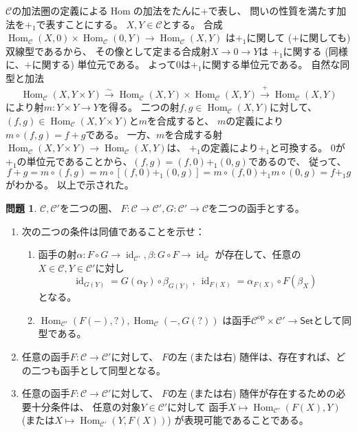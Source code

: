 \documentclass[uplatex,dvipdfmx]{jsarticle}
\makeatletter
\theoremstyle{definition}
\newtheorem{prob}[prob]{問題}
\renewenvironment{proof}[1][\proofname]{
  \pushQED{\qed}%
  \normalfont \topsep6\p@\@plus6\p@\relax
  \trivlist
  \item[\hskip\labelsep
    #1\@addpunct{\textbf{.}}]\ignorespaces
}{%
  \popQED\endtrivlist\@endpefalse
}
\providecommand{\proofname}{証明}
\DeclareMathOperator{\Hom}{\mathrm{Hom}}
\DeclareMathOperator{\id}{\mathrm{id}}
\newcommand{\op}{\mathrm{op}}
\newcommand\sfSet{\mathsf{Set}}
\newcommand\mcC{\mathcal{C}}
\makeatother
\begin{document}
\begin{proof}
  \(\mcC\)の加法圏の定義による\(\Hom\)の加法をたんに\(+\)で表し、
  問いの性質を満たす加法を\(+_1\)で表すことにする。
  \(X,Y\in \mcC\)とする。
  合成\(\Hom_{\mcC}(X,0)\times \Hom_{\mcC}(0,Y)\to \Hom_{\mcC}(X,Y)\)
  は\(+_1\)に関して (\(+\)に関しても) 双線型であるから、
  その像として定まる合成射\(X\to 0 \to Y\)は
  \(+_1\)に関する (同様に、\(+\)に関する) 単位元である。
  よって\(0\)は\(+_1\)に関する単位元である。
  自然な同型と加法
  \[
  \Hom_{\mcC}(X,Y\times Y) \xrightarrow{\sim}
  \Hom_{\mcC}(X,Y) \times \Hom_{\mcC}(X,Y) \xrightarrow{+} \Hom_{\mcC}(X,Y)
  \]
  により射\(m:Y\times Y\to Y\)を得る。
  二つの射\(f,g\in \Hom_{\mcC}(X,Y)\)に対して、
  \((f,g)\in \Hom_{\mcC}(X,Y\times Y)\)と\(m\)を合成すると、
  \(m\)の定義により\(m\circ (f,g) = f+g\)である。
  一方、\(m\)を合成する射
  \(\Hom_{\mcC}(X,Y\times Y) \to \Hom_{\mcC}(X,Y)\)は、
  \(+_1\)の定義により\(+_1\)と可換する。
  \(0\)が\(+_1\)の単位元であることから、\((f,g) = (f,0) +_1 (0,g)\)であるので、
  従って、
  \[
  f+g = m\circ (f,g) = m\circ [(f,0)+_1(0,g)]
  = m\circ (f,0) +_1 m\circ (0,g)
  = f+_1 g
  \]
  がわかる。
  以上で示された。
\end{proof}



\begin{prob}\label{prob: 1.2}
  \(\mcC,\mcC'\)を二つの圏、
  \(F:\mcC\to \mcC', G:\mcC'\to \mcC\)を二つの函手とする。
  \begin{enumerate}
    \item \label{enumi: 1.2.1}
    次の二つの条件は同値であることを示せ：
    \begin{enumerate}
      \item \label{enumii: 1.2.1.1}
      函手の射\(\alpha:F\circ G \to \id_{\mcC'}, \beta:G\circ F \to \id_{\mcC}\)
      が存在して、任意の\(X\in \mcC, Y\in \mcC'\)に対し
      \[
      \id_{G(Y)} = G(\alpha_Y) \circ \beta_{G(Y)} \ , \
      \id_{F(X)} = \alpha_{F(X)} \circ F(\beta_X)
      \]
      となる。
      \item \label{enumii: 1.2.1.2}
      \(\Hom_{\mcC'}(F(-),?),\Hom_{\mcC}(-,G(?))\)
      は函手\(\mcC^{\op}\times \mcC' \to \sfSet\)として同型である。
    \end{enumerate}
    \item \label{enumi: 1.2.2}
    任意の函手\(F:\mcC\to \mcC'\)に対して、
    \(F\)の左 (または右) 随伴は、存在すれば、どの二つも函手として同型となる。
    \item \label{enumi: 1.2.3}
    任意の函手\(F:\mcC\to \mcC'\)に対して、
    \(F\)の左 (または右) 随伴が存在するための必要十分条件は、
    任意の対象\(Y\in \mcC'\)に対して
    函手\(X\mapsto \Hom_{\mcC'}(F(X),Y)\)
    (または\(X\mapsto \Hom_{\mcC'}(Y,F(X))\))
    が表現可能であることである。
  \end{enumerate}
\end{prob}
\end{document}
